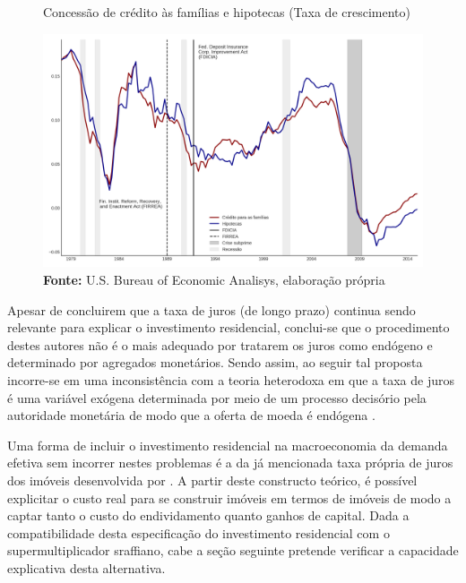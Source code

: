 \begin{figure}[htb]
	\centering
	\caption{Concessão de crédito às famílias e hipotecas (Taxa de crescimento)}
	\label{FigCreditoFDICIA}
	\includegraphics[width=\textwidth]{../../Dados/Fatos_Estilizados/figs/FDICIA.png}
	\caption*{\textbf{Fonte:} U.S. Bureau of Economic Analisys, elaboração própria}
\end{figure}
	
Apesar de \textcite{gauger_residential_2003} concluirem que a taxa de juros (de longo prazo) continua sendo relevante para explicar o investimento residencial, conclui-se que o procedimento destes autores não é o mais adequado por tratarem os juros como endógeno e determinado por agregados monetários. Sendo assim, ao seguir tal proposta incorre-se em uma inconsistência com a teoria heterodoxa em que a taxa de juros é uma variável exógena determinada por meio de um processo decisório pela autoridade monetária de modo que a oferta de moeda é endógena \cite[p.~230--256]{lavoie_post-keynesian_2015}.

Uma forma de incluir o investimento residencial na macroeconomia da demanda efetiva sem incorrer nestes problemas é a da já mencionada taxa própria de juros dos imóveis desenvolvida por \textcite{teixeira_crescimento_2015}. A partir deste constructo teórico, é possível explicitar o custo real para se construir imóveis em termos de imóveis de modo a captar tanto o custo do endividamento quanto ganhos de capital.
Dada a compatibilidade desta especificação do investimento residencial com o supermultiplicador sraffiano, cabe a seção seguinte pretende verificar a capacidade explicativa desta alternativa.



